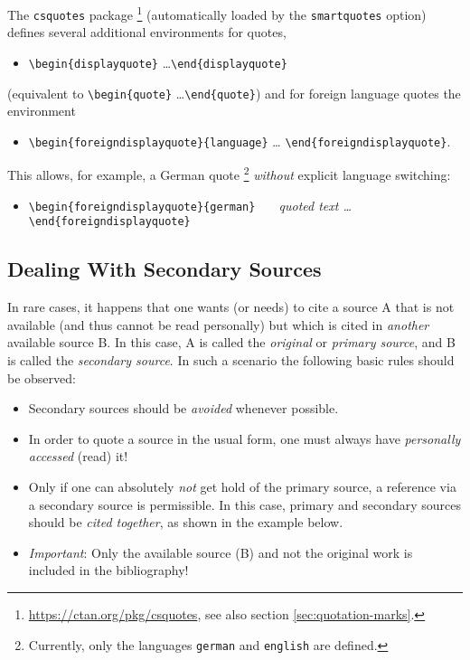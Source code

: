 The \texttt{csquotes} package%
\footnote{\url{https://ctan.org/pkg/csquotes}, see also section
\ref{sec:quotation-marks}.}
(automatically loaded by the \texttt{smartquotes} option) defines several
additional environments for quotes, \eg
%
\begin{itemize}
    \item[] \verb!\begin{displayquote}! \ldots \verb!\end{displayquote}!
\end{itemize}
%
(equivalent to \verb!\begin{quote}! \ldots \verb!\end{quote}!) and for foreign
language quotes the environment
%
\begin{itemize}
    \item[] \verb!\begin{foreigndisplayquote}{language}! \ldots
    \verb!\end{foreigndisplayquote}!.
\end{itemize}
%
This allows, for example, a German quote%
\footnote{Currently, only the languages \texttt{german} and \texttt{english}
are defined.}
\emph{without} explicit language switching:
%
\begin{itemize}
    \item[] \verb!\begin{foreigndisplayquote}{german}!\newline
       \verb!   !\emph{quoted text \ldots}\newline
    \verb!\end{foreigndisplayquote}!
\end{itemize}

\subsection{Dealing With Secondary Sources}

In rare cases, it happens that one wants (or needs) to cite a source \textrm{A}
that is not available (and thus cannot be read personally) but which is cited in
\emph{another} available source \textrm{B}. In this case, \textrm{A} is called
the \emph{original} or \emph{primary source}, and \textrm{B} is called the
\emph{secondary source}. In such a scenario the following basic rules should be
observed:
%
\begin{itemize}
    \item Secondary sources should be \emph{avoided} whenever
    possible.
    \item In order to quote a source in the usual form, one must always have
    \emph{personally accessed} (read) it!
    \item Only if one can absolutely \emph{not} get hold of the primary source, a
    reference via a secondary source is permissible. In this case, primary and
    secondary sources should be \emph{cited together}, as shown in the example
    below.
    \item \emph{Important}: Only the available source (\textrm{B}) and not
    the original work is included in the bibliography!
\end{itemize}
%
